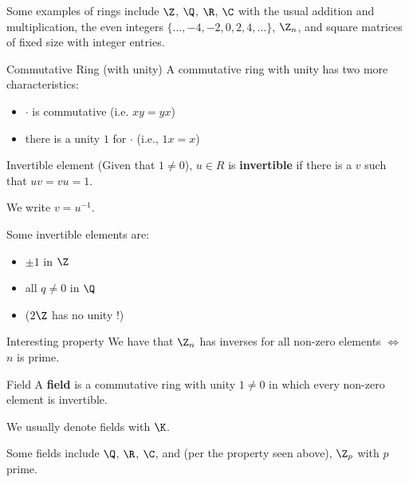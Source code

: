\documentclass[a4paper, 11pt]{report}
\begin{document}
Some examples of rings include $\Z$, $\Q$, $\R$, $\C$ with the usual addition and multiplication, the even integers $\{\dots, -4, -2, 0, 2, 4, \dots\}$, $\Z_{n}$, and square matrices of fixed size with integer entries.

\begin{defframe}{Commutative Ring (with unity)}{}
    A commutative ring with unity has two more characteristics:
    \begin{itemize}
        \item $\cdot $ is commutative (i.e. $x y = y x $)
        \item there is a unity $1$ for $\cdot $ (i.e., $1x = x$)
    \end{itemize}
\end{defframe}

\begin{defframe}{Invertible element}{}
    (Given that $1 \neq 0$), $u \in R$ is \textbf{invertible} if there is a $v$ such that $uv = vu = 1$.

    We write $v = u^{-1}$.
\end{defframe}

Some invertible elements are:
\begin{itemize}
    \item $\pm 1$ in $\Z$
    \item all $q \neq 0$ in $\Q$
    \item ($2\Z$ has no unity !)
\end{itemize}

\begin{gframe}{Interesting property}
    We have that $\Z_{n}$ has inverses for all non-zero elements $\iff $ $n$ is prime.
\end{gframe}


\begin{defframe}{Field}{}
    A \textbf{field} is a commutative ring with unity $1 \neq 0$ in which every non-zero element is invertible.

    We usually denote fields with $\K$.
\end{defframe}

Some fields include $\Q$, $\R$, $\C$, and (per the property seen above), $\Z_{p}$ with $p$ prime.
\end{document}
